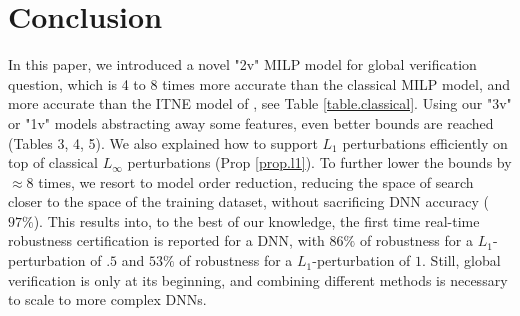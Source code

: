 \documentclass[letterpaper]{article} %
\begin{document}
	
	


	\vspace{-0.5cm}
	
	
	
	
\section{Conclusion}

In this paper, we introduced a novel "2v" MILP model for global verification question, which is 4 to 8 times more accurate than the classical MILP model,
and more accurate than the ITNE model of \cite{lipshitz}, see Table \ref{table.classical}. Using our "3v" or "1v" models abstracting away some features,
 even better bounds are reached (Tables 3, 4, 5). We also explained how to support $L_1$ perturbations efficiently on top of classical $L_\infty$ perturbations (Prop \ref{prop.l1}). To further lower the bounds by $\approx 8$ times, we resort to model order reduction, reducing the space of search closer to the space of the training dataset, without sacrificing DNN accuracy ($97\%$). This results into, to the best of our knowledge, the first time real-time robustness certification is reported for a DNN, with $86\%$ of robustness for a $L_1$-perturbation of $.5$ and $53\%$ of robustness for a $L_1$-perturbation of $1$. Still, global verification is only at its beginning, and combining different methods is necessary to scale to more complex DNNs.

	
	
	
	
	 
	
	
	\newpage

	
	
	
	
\end{document}
